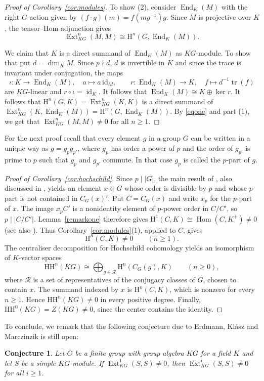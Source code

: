 \documentclass[11pt,a4paper]{amsart}
\newtheorem{conjecture}[theorem]{Conjecture}
\numberwithin{equation}{section}
\DeclareMathOperator{\Ext}{Ext}
\DeclareMathOperator{\Hom}{Hom}
\DeclareMathOperator{\End}{End}
\DeclareMathOperator{\id}{id}
\DeclareMathOperator{\tr}{tr}
\newcommand{\HH}{\mathrm H}
\newcommand{\Hoch}{\mathrm{HH}}
\begin{document}
\begin{proof}[Proof of Corollary~\ref{cor:modules}]
To show (2), consider $\End_K(M)$ with the right $G$-action given by $(f\cdot g)(m)=f(mg^{-1})g$. Since $M$ is projective over $K$, the  tensor--Hom adjunction
\cite[Proposition~3.1.8(iii), pp.~53--54]{Ben} gives
\begin{equation}
    \Ext^n_{KG}(M,M)\cong\HH^n(G,\End_K(M)). \label{eqone}
\end{equation}

We claim that $K$ is a direct summand of $\End_K(M)$ as $KG$-module.  To show that put $d=\dim_K M$. Since $p\nmid d$, $d$ is invertible in $K$ and since the trace is invariant under conjugation, the maps 
\[
 \iota:K\longrightarrow\End_K(M),\quad a\longmapsto a\,\mathrm{id}_M,
 \qquad
 r:\End_K(M)\longrightarrow K,\quad f\longmapsto d^{-1}\tr(f)
\]
are $KG$-linear and $r\circ \iota=\id_K$. It follows that $\End_K(M)\cong K\oplus \ker r$.
It follows that $\HH^n(G,K)= \Ext_{KG}^n(K, K)$ is a direct summand of $\Ext_{KG}^n(K, \End_K(M))=\HH^n(G,\End_K(M))$. By \eqref{eqone} and part (1), we get that $\Ext^n_{KG}(M,M)\neq 0$ for all $n\geq 1$.
\end{proof}
For the next proof recall that every element $g$ in a group $G$ can be written in a unique way as $g=g_{p} g_{p'}$, where $g_p$ has order a power of $p$ and the order of $g_{p'}$ is prime to $p$ such that $g_p$ and $g_{p'}$ commute. In that case $g_p$ is called the $p$-part of $g$.
\begin{proof}[Proof of Corollary~\ref{cor:hochschild}]

Since $p\mid|G|$, the main result of \cite{FJL}, also discussed
in \cite{Mur}, yields an element $x\in G$ whose order is
divisible by $p$ and whose $p$-part is not contained in $C_G(x)'$.
Put $C=C_G(x)$ and write $x_p$ for the $p$-part of $x$.
The image $x_pC'$ is a nonidentity element of $p$-power order
in $C/C'$, so $p\mid|C/C'|$. Lemma~\ref{remarkone} therefore
gives $\HH^1(C,K)\cong\Hom(C,K^+)\neq0$ (see also \cite[Proposition~2.10]{Mur}).
Thus
Corollary~\ref{cor:modules}(1), applied to $C$, gives
\[
 \HH^n(C,K)\neq0\qquad(n\geq1).
\]
 The centraliser decomposition for Hochschild cohomology
\cite[Theorem~2.11.2]{Ben2} yields an isomorphism of $K$-vector spaces
\[
 \Hoch^n(KG)\cong
 \bigoplus_{g\in\mathcal R}\HH^n(C_G(g),K)
 \qquad(n\geq 0),
\]
where $\mathcal R$ is a set of representatives of the conjugacy
classes of $G$, chosen to contain $x$.
 The summand indexed by $x$ is $\HH^n(C,K)$, which is nonzero
for every $n\geq1$. Hence $\Hoch^n(KG)\neq0$ in every positive
degree. Finally,
$\Hoch^0(KG)=Z(KG)\neq0$, since the center contains the identity. 
\end{proof}
To conclude, we remark that the following conjecture due to  Erdmann, Kl\'asz and Marczinzik \cite[Conjecture S]{EKM} is still open:
\begin{conjecture}
Let $G$ be a finite group with group algebra $KG$ for a field $K$ and let $S$ be a simple $KG$-module. If $\Ext_{KG}^1(S,S) \neq 0$, then $\Ext_{KG}^i(S,S) \neq 0$ for all $i \geq 1$.
\end{conjecture}
\end{document}
